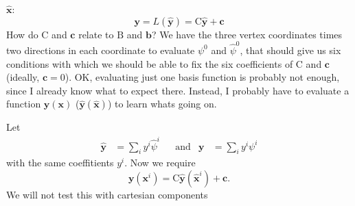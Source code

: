 \documentclass{scrartcl}
\begin{document}
$\mathbf{\hat x}$:
\begin{equation}
  \mathbf y=L(\mathbf{\hat y})=\mathrm C\mathbf{\hat y}+\mathbf c
\end{equation}
How do $\mathrm C$ and $\mathbf c$ relate to $\mathrm B$ and $\mathbf b$?  We
have the three vertex coordinates times two directions in each coordinate to
evaluate $\psi^0$ and $\hat\psi^0$, that should give us six conditions with
which we should be able to fix the six coefficients of $\mathrm C$ and
$\mathbf c$ (ideally, $\mathbf c=0$).  OK, evaluating just one basis function
is probably not enough, since I already know what to expect there.  Instead, I
probably have to evaluate a function $\mathbf y(\mathbf x)$ ($\mathbf{\hat
  y}(\mathbf{\hat x})$) to learn whats going on.

Let
\begin{align}
  \mathbf{\hat y}&=\sum_iy^i\hat\psi^i &&\text{and} &\mathbf y&=\sum_iy^i\psi^i
\end{align}
with the same coeffitients $y^i$.  Now we require
\begin{equation}
  \mathbf y(\mathbf x^i)=\mathrm C\mathbf{\hat y}(\mathbf{\hat x}^i)+\mathbf c.
\end{equation}
We will not test this with cartesian components
\end{document}
